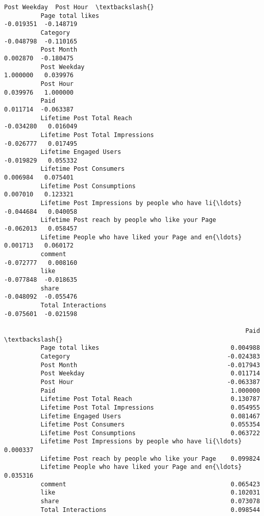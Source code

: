 \documentclass[11pt]{article}
\begin{document}
\begin{Verbatim}[commandchars=\\\{\}]
                                                              Post Weekday  Post Hour  \textbackslash{}
          Page total likes                                       -0.019351  -0.148719   
          Category                                               -0.048798  -0.110165   
          Post Month                                              0.002870  -0.180475   
          Post Weekday                                            1.000000   0.039976   
          Post Hour                                               0.039976   1.000000   
          Paid                                                    0.011714  -0.063387   
          Lifetime Post Total Reach                              -0.034280   0.016049   
          Lifetime Post Total Impressions                        -0.026777   0.017495   
          Lifetime Engaged Users                                 -0.019829   0.055332   
          Lifetime Post Consumers                                 0.006984   0.075401   
          Lifetime Post Consumptions                              0.007010   0.123321   
          Lifetime Post Impressions by people who have li{\ldots}     -0.044684   0.040058   
          Lifetime Post reach by people who like your Page       -0.062013   0.058457   
          Lifetime People who have liked your Page and en{\ldots}      0.001713   0.060172   
          comment                                                -0.072777   0.008160   
          like                                                   -0.077848  -0.018635   
          share                                                  -0.048092  -0.055476   
          Total Interactions                                     -0.075601  -0.021598   
          
                                                                  Paid  \textbackslash{}
          Page total likes                                    0.004988   
          Category                                           -0.024383   
          Post Month                                         -0.017943   
          Post Weekday                                        0.011714   
          Post Hour                                          -0.063387   
          Paid                                                1.000000   
          Lifetime Post Total Reach                           0.130787   
          Lifetime Post Total Impressions                     0.054955   
          Lifetime Engaged Users                              0.081467   
          Lifetime Post Consumers                             0.055354   
          Lifetime Post Consumptions                          0.063722   
          Lifetime Post Impressions by people who have li{\ldots}  0.000337   
          Lifetime Post reach by people who like your Page    0.099824   
          Lifetime People who have liked your Page and en{\ldots}  0.035316   
          comment                                             0.065423   
          like                                                0.102031   
          share                                               0.073078   
          Total Interactions                                  0.098544   
          

\end{Verbatim}
\end{document}
